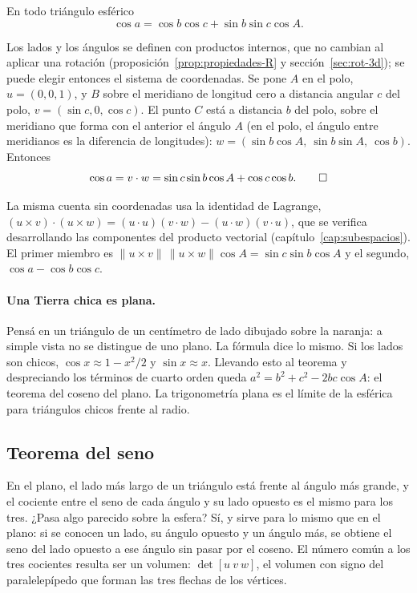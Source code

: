 \begin{teorema}\label{teo:coseno-lados}
En todo triángulo esférico
\[
  \cos a=\cos b\cos c+\sin b\sin c\cos A .
\]
\end{teorema}

\begin{demostracion}
Los lados y los ángulos se definen con productos internos, que no cambian al aplicar una
rotación (proposición~\ref{prop:propiedades-R} y sección~\ref{sec:rot-3d}); se puede elegir
entonces el sistema de coordenadas. Se pone \(A\) en el polo, \(u=(0,0,1)\), y \(B\) sobre el
meridiano de longitud cero a distancia angular \(c\) del polo, \(v=(\sin c,0,\cos c)\). El
punto \(C\) está a distancia \(b\) del polo, sobre el meridiano que forma con el anterior el
ángulo \(A\) (en el polo, el ángulo entre meridianos es la diferencia de longitudes):
\(w=(\sin b\cos A,\ \sin b\sin A,\ \cos b)\). Entonces
\[
  \cos a=v\cdot w=\sin c\sin b\cos A+\cos c\cos b . \qedhere
\]
\end{demostracion}

La misma cuenta sin coordenadas usa la identidad de Lagrange,
\((u\times v)\cdot(u\times w)=(u\cdot u)(v\cdot w)-(u\cdot w)(v\cdot u)\), que se verifica
desarrollando las componentes del producto vectorial (capítulo~\ref{cap:subespacios}). El
primer miembro es \(\|u\times v\|\,\|u\times w\|\cos A=\sin c\sin b\cos A\) y el segundo,
\(\cos a-\cos b\cos c\).

\paragraph{Una Tierra chica es plana.} Pensá en un triángulo de un centímetro de lado dibujado
sobre la naranja: a simple vista no se distingue de uno plano. La fórmula dice lo mismo. Si
los lados son chicos, \(\cos x\approx1-x^2/2\) y \(\sin x\approx x\). Llevando esto al
teorema y despreciando los términos de cuarto orden queda \(a^2=b^2+c^2-2bc\cos A\): el
teorema del coseno del plano. La trigonometría plana es el límite de la esférica para
triángulos chicos frente al radio.

\subsection{Teorema del seno}

En el plano, el lado más largo de un triángulo está frente al ángulo más grande, y el cociente
entre el seno de cada ángulo y su lado opuesto es el mismo para los tres. ¿Pasa algo parecido
sobre la esfera? Sí, y sirve para lo mismo que en el plano: si se conocen un lado, su ángulo
opuesto y un ángulo más, se obtiene el seno del lado opuesto a ese ángulo sin pasar por
el coseno. El número
común a los tres cocientes resulta ser un volumen: \(\det[u\ v\ w]\), el volumen con signo del
paralelepípedo que forman las tres flechas de los vértices.

